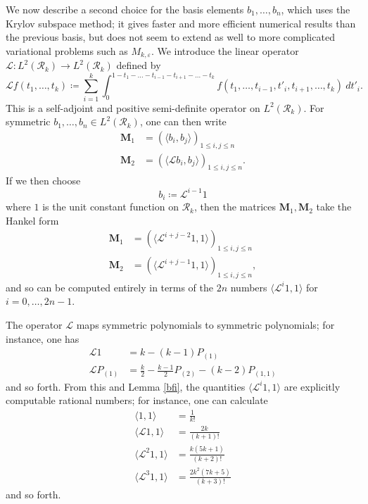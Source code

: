\documentclass{bmcart}
\theoremstyle{plain}
\theoremstyle{definition}
\newcommand\eps{\varepsilon}
\begin{document}
We now describe a second choice for the basis elements $b_1,\dots,b_n$, which uses the Krylov subspace method; it gives faster and more efficient numerical results than the previous basis, but does not seem to extend as well to more complicated variational problems such as $M_{k,\eps}$.  We introduce the linear operator ${\mathcal L}: L^2({\mathcal R}_k) \to L^2({\mathcal R}_k)$ defined by
$$ {\mathcal L} f( t_1,\dots,t_k) \coloneqq \sum_{i=1}^k \int_0^{1-t_1-\dots-t_{i-1}-t_{i+1}-\dots-t_k} f(t_1,\dots,t_{i-1},t'_i,t_{i+1},\dots,t_k)\ dt'_i.$$
This is a self-adjoint and positive semi-definite operator on $L^2({\mathcal R}_k)$.  For symmetric $b_1,\dots,b_n \in L^2({\mathcal R}_k)$, one can then write
\begin{align*}
\mathbf{M}_1 &= \left( \langle b_i, b_j \rangle \right)_{1 \leq i,j \leq n} \\
\mathbf{M}_2 &= \left( \langle {\mathcal L} b_i, b_j \rangle \right)_{1 \leq i,j \leq n}.
\end{align*}
If we then choose
$$ b_i \coloneqq {\mathcal L}^{i-1} 1$$
where $1$ is the unit constant function on ${\mathcal R}_k$, then the matrices $\mathbf{M}_1,\mathbf{M}_2$ take the Hankel form
\begin{align*}
\mathbf{M}_1 &= \left( \langle {\mathcal L}^{i+j-2} 1, 1 \rangle \right)_{1 \leq i,j \leq n} \\
\mathbf{M}_2 &= \left( \langle {\mathcal L}^{i+j-1} 1, 1 \rangle \right)_{1 \leq i,j \leq n},
\end{align*}
and so can be computed entirely in terms of the $2n$ numbers $\langle {\mathcal L}^i 1, 1 \rangle$ for $i=0,\dots,2n-1$.

The operator ${\mathcal L}$ maps symmetric polynomials to symmetric polynomials; for instance, one has
\begin{align*}
{\mathcal L} 1 &= k - (k-1) 	P_{(1)} \\
{\mathcal L} P_{(1)} &= \frac{k}{2} - \frac{k-1}{2} P_{(2)} - (k-2) P_{(1,1)}
\end{align*}
and so forth.  From this and Lemma \ref{bfi}, the quantities $\langle {\mathcal L}^i 1, 1 \rangle$ are explicitly computable rational numbers; for instance, one can calculate
\begin{align*}
\langle 1, 1 \rangle &= \frac{1}{k!} \\
\langle {\mathcal L} 1, 1\rangle &= \frac{2k}{(k+1)!} \\
\langle {\mathcal L}^2 1, 1\rangle &= \frac{k (5k+1)}{(k+2)!} \\
\langle {\mathcal L}^3 1, 1\rangle &= \frac{2k^2 (7k+5)}{(k+3)!}
\end{align*}
and so forth.
\end{document}
